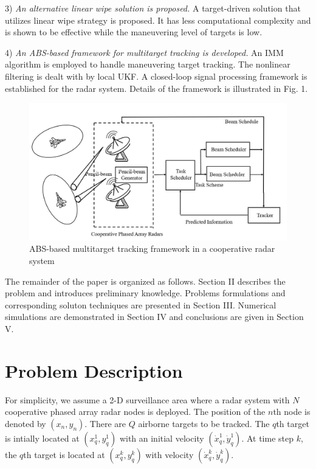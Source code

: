 \documentclass[12pt,journal,draftclsnofoot,onecolumn]{IEEEtran}
\begin{document}
3) \emph{An alternative linear wipe solution is proposed.} A target-driven solution that utilizes linear wipe strategy is proposed. It has less computational complexity and is shown to be effective while the maneuvering level of targets is low.

4) \emph{An ABS-based framework for multitarget tracking is developed.} An IMM algorithm is employed to handle maneuvering target tracking. The nonlinear filtering is dealt with by local UKF. A closed-loop signal processing framework is established for the radar system. Details of the framework is illustrated in Fig. 1.

\begin{figure}
	\centering
	\includegraphics[scale=0.28]{Flow Chart.jpg}
	\caption{ABS-based multitarget tracking framework in a cooperative radar system}
	\label{fig:system}
\end{figure}

The remainder of the paper is organized as follows. Section II describes the problem and introduces preliminary knowledge. Problems formulations and corresponding soluton techniques are presented in Section III. Numerical simulations are demonstrated in Section IV and conclusions are given in Section V. 

\section{Problem Description}
For simplicity, we assume a 2-D surveillance area where a radar system with $N$ cooperative phased array radar nodes is deployed. The position of the $n$th node is denoted by $(x_{n},y_{n})$. There are $Q$ airborne targets to be tracked. The $q$th target is intially located at $(x_q^1,y_q^1)$ with an initial velocity $(\dot{x}_q^1,\dot{y}_q^1)$. At time step $k$, the $q$th target is located at $(x_q^k,y_q^k)$ with velocity $(\dot{x}_q^k,\dot{y}_q^k)$.
\end{document}
